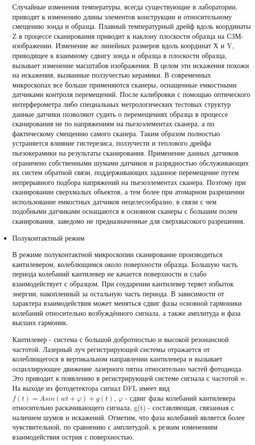 \documentclass[a4paper,12pt]{article}
\renewcommand{\phi}{\ensuremath{\varphi}}
\theoremstyle{plain} %
\theoremstyle{definition} %
\theoremstyle{remark} %
\begin{document}
\begin{itemize}
Случайные изменения температуры, всегда существующие в лаборатории, приводят к изменению длины элементов конструкции и относительному смещению зонда и образца. 
Плавный температурный дрейф вдоль координаты Z в процессе сканирования приводит к наклону плоскости образца на СЗМ-изображении. Изменение же линейных размеров вдоль координат Х и Y, приводящее к взаимному сдвигу зонда и образца в плоскости образца, вызывает изменение масштабов изображения. В целом эти искажения похожи на искажения, вызванные ползучестью керамики. 
В современных микроскопах все больше применяются сканеры, оснащенные емкостными датчиками контроля перемещений. После калибровки с помощью оптического интерферометра либо специальных метрологических тестовых структур данные датчики позволяют судить о перемещениях образца в процессе сканирования не по напряжениям на пьезоэлементах сканера, а по фактическому смещению самого сканера. Таким образом полностью устраняется влияние гистерезиса, ползучести и теплового дрейфа пьезокерамики на результаты сканирования. Применение данных датчиков ограничено собственными шумами датчиков и разрядностью обслуживающих их систем обратной связи, поддерживающих заданное перемещение путем непрерывного подбора напряжений на пьезоэлементах сканера. Поэтому при сканировании сверхмалых объектов, а тем более при атомарном разрешении использование емкостных датчиков нецелесообразно, в связи с чем подобными датчиками оснащаются в основном сканеры с большим полем сканирования, заведомо не предназначенные для сверхвысокого разрешения.
\item
Полуконтактный режим


В режиме полуконтактной микроскопии сканирование производиться кантилевером, колеблющимся около поверхности образца. Большую часть периода колебаний кантилевер не качается поверхности и слабо взаимодействует с образцом. При соударении кантилевер теряет избыток энергии, накопленный за остальную часть периода. В зависимости от характера взаимодействия может меняться сдвиг фазы основной гармоники колебаний относительно возбуждённого сигнала, а также амплитуда и фаза высших гармоник.


Кантилевер - система с большой добротностью и высокой резонансной частотой. Лазерный луч регистрирующей системы отражается от колеблющегося в вертикальном направлении кантилевера и вызывает осциллирующее движение лазерного пятна относительно частей фотодиода. Это приводит к появлению в регистрирующей системе сигнала с частотой w. На выходе из фотодетектора сигнал DFL имеет вид $ f(t)=Asin(wt + \phi) + g(t) $, $ \phi $ - сдвиг фазы колебаний кантилевера относительно раскачивающего сигнала, g(t) - составляющая, связанная с наличием шумов и искажений. Отметим, что фаза колебаний является более чувствительной, по сравнению с амплитудой, к резким изменениям взаимодействия острия с поверхностью.



\end{itemize}
\end{document}
